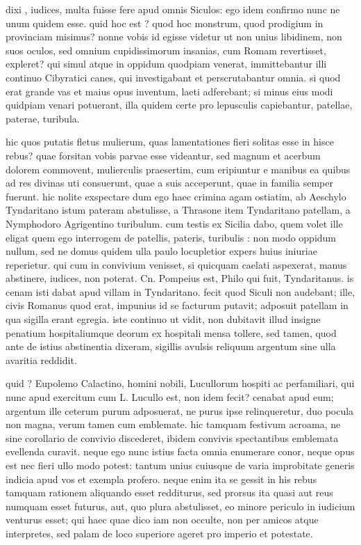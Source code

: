  dixi , iudices, multa fuisse fere apud omnis Siculos: ego idem confirmo nunc ne unum quidem esse. quid hoc est ? quod hoc monstrum, quod prodigium in provinciam misimus? nonne vobis id egisse videtur ut non unius libidinem, non suos oculos, sed omnium cupidissimorum insanias, cum Romam revertisset, expleret? qui simul atque in oppidum quodpiam venerat, immittebantur illi continuo Cibyratici canes, qui investigabant et perscrutabantur omnia. si quod erat grande vas et maius opus inventum, laeti adferebant; si minus eius modi quidpiam venari potuerant, illa quidem certe pro lepusculis capiebantur, patellae, paterae, turibula.

 hic quos putatis fletus mulierum, quas lamentationes fieri solitas esse in hisce rebus? quae forsitan vobis parvae esse videantur, sed magnum et acerbum dolorem commovent, mulierculis praesertim, cum eripiuntur e manibus ea quibus ad res divinas uti consuerunt, quae a suis acceperunt, quae in familia semper fuerunt. hic nolite exspectare dum ego haec crimina agam ostiatim, ab Aeschylo Tyndaritano istum pateram abstulisse, a Thrasone item Tyndaritano patellam, a Nymphodoro Agrigentino turibulum. cum testis ex Sicilia dabo, quem volet ille eligat quem ego interrogem de patellis, pateris, turibulis : non modo oppidum nullum, sed ne domus quidem ulla paulo locupletior expers huius iniuriae reperietur. qui cum in convivium venisset, si quicquam caelati aspexerat, manus abstinere, iudices, non poterat. Cn. Pompeius est, Philo qui fuit, Tyndaritanus. is cenam isti dabat apud villam in Tyndaritano. fecit quod Siculi non audebant; ille, civis Romanus quod erat, impunius id se facturum putavit; adposuit patellam in qua sigilla erant egregia. iste continuo ut vidit, non dubitavit illud insigne penatium hospitaliumque deorum ex hospitali mensa tollere, sed tamen, quod ante de istius abstinentia dixeram, sigillis avulsis reliquum argentum sine ulla avaritia reddidit.

 quid ? Eupolemo Calactino, homini nobili, Lucullorum hospiti ac perfamiliari, qui nunc apud exercitum cum L. Lucullo est, non idem fecit? cenabat apud eum; argentum ille ceterum purum adposuerat, ne purus ipse relinqueretur, duo pocula non magna, verum tamen cum emblemate. hic tamquam festivum acroama, ne sine corollario de convivio discederet, ibidem convivis spectantibus emblemata evellenda curavit. neque ego nunc istius facta omnia enumerare conor, neque opus est nec fieri ullo modo potest: tantum unius cuiusque de varia improbitate generis indicia apud vos et exempla profero. neque enim ita se gessit in his rebus tamquam rationem aliquando esset redditurus, sed prorsus ita quasi aut reus numquam esset futurus, aut, quo plura abstulisset, eo minore periculo in iudicium venturus esset; qui haec quae dico iam non occulte, non per amicos atque interpretes, sed palam de loco superiore ageret pro imperio et potestate.


